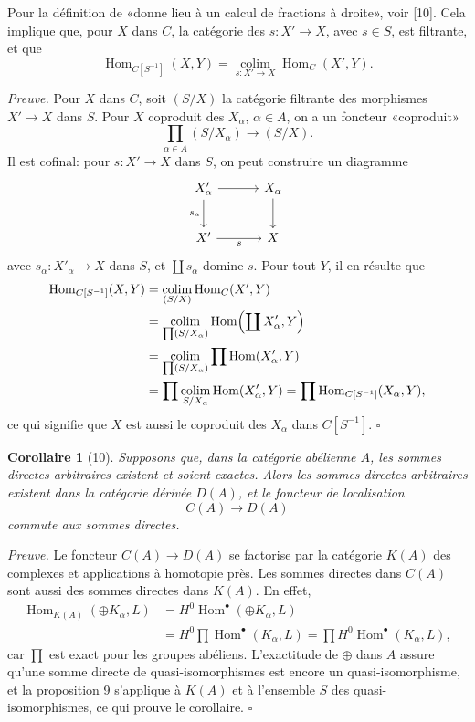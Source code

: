 \documentclass[11pt]{article}
\newcommand{\Hom}{\operatorname{Hom}}
\theoremstyle{deligne}
\newtheorem*{corollary*}{Corollaire}
\newenvironment{proofdel}{\noindent\textit{Preuve.}}{\hfill$\square$}
\begin{document}
Pour la définition de «donne lieu à un calcul de fractions à droite», voir [10]. Cela implique que, pour \(X\) dans \(C\), la catégorie des \(s:X'\to X\), avec \(s\in S\), est filtrante, et que
\[
\Hom_{C[S^{-1}]}(X,Y)=
\operatorname*{colim}_{s:X'\to X}\Hom_C(X',Y).
\]

\begin{proofdel}
Pour \(X\) dans \(C\), soit \((S/X)\) la catégorie filtrante des morphismes \(X'\to X\) dans \(S\). Pour \(X\) coproduit des \(X_\alpha\), \(\alpha\in A\), on a un foncteur «coproduit»
\[
\prod_{\alpha\in A}(S/X_\alpha)\longrightarrow(S/X).
\]
Il est cofinal: pour \(s:X'\to X\) dans \(S\), on peut construire un diagramme
\[
\begin{tikzcd}[column sep=3.2em,row sep=2.2em]
X'_\alpha \arrow[r] \arrow[d,"s_\alpha"'] & X_\alpha \arrow[d]\\
X' \arrow[r,"s"'] & X
\end{tikzcd}
\]
avec \(s_\alpha:X'_\alpha\to X\) dans \(S\), et \(\coprod s_\alpha\) domine \(s\). Pour tout \(Y\), il en résulte que
\[
\begin{aligned}
\Hom_{C[S^{-1}]}(X,Y)
&=\operatorname*{colim}_{(S/X)}\Hom_C(X',Y)\\
&=\operatorname*{colim}_{\prod(S/X_\alpha)}\Hom\Bigl(\coprod X'_\alpha,Y\Bigr)\\
&=\operatorname*{colim}_{\prod(S/X_\alpha)}\prod\Hom(X'_\alpha,Y)\\
&=\prod\operatorname*{colim}_{S/X_\alpha}\Hom(X'_\alpha,Y)
 =\prod\Hom_{C[S^{-1}]}(X_\alpha,Y),
\end{aligned}
\]
ce qui signifie que \(X\) est aussi le coproduit des \(X_\alpha\) dans \(C[S^{-1}]\).
\end{proofdel}

\begin{corollary*}[10]
Supposons que, dans la catégorie abélienne \(A\), les sommes directes arbitraires existent et soient exactes. Alors les sommes directes arbitraires existent dans la catégorie dérivée \(D(A)\), et le foncteur de localisation
\[
C(A)\longrightarrow D(A)
\]
commute aux sommes directes.
\end{corollary*}

\begin{proofdel}
Le foncteur \(C(A)\to D(A)\) se factorise par la catégorie \(K(A)\) des complexes et applications à homotopie près. Les sommes directes dans \(C(A)\) sont aussi des sommes directes dans \(K(A)\). En effet,
\[
\begin{aligned}
\Hom_{K(A)}(\oplus K_\alpha,L)
&=H^0\Hom^\bullet(\oplus K_\alpha,L)\\
&=H^0\prod\Hom^\bullet(K_\alpha,L)
 =\prod H^0\Hom^\bullet(K_\alpha,L),
\end{aligned}
\]
car \(\prod\) est exact pour les groupes abéliens. L'exactitude de \(\oplus\) dans \(A\) assure qu'une somme directe de quasi-isomorphismes est encore un quasi-isomorphisme, et la proposition 9 s'applique à \(K(A)\) et à l'ensemble \(S\) des quasi-isomorphismes, ce qui prouve le corollaire.
\end{proofdel}
\end{document}
